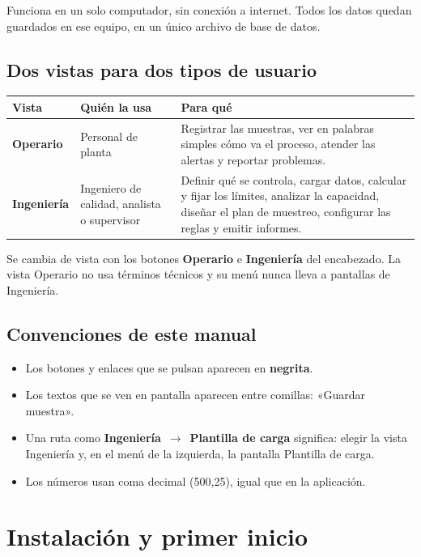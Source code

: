 \documentclass[11pt,a4paper]{article}
\newcommand{\boton}[1]{\textbf{#1}}                      %
\newcommand{\campo}[1]{«#1»}                             %
\newcommand{\ruta}[2]{\textbf{#1}~$\rightarrow$~\textbf{#2}} %
\begin{document}
Funciona en un solo computador, sin conexión a internet. Todos los datos quedan guardados en ese
equipo, en un único archivo de base de datos.

\subsection{Dos vistas para dos tipos de usuario}

\begin{tabularx}{\linewidth}{@{}P{2.6cm}P{4.2cm}L@{}}
\toprule
\textbf{Vista} & \textbf{Quién la usa} & \textbf{Para qué}\\
\midrule
\textbf{Operario} & Personal de planta & Registrar las muestras, ver en palabras simples cómo va el proceso, atender las alertas y reportar problemas.\\
\textbf{Ingeniería} & Ingeniero de calidad, analista o supervisor & Definir qué se controla, cargar datos, calcular y fijar los límites, analizar la capacidad, diseñar el plan de muestreo, configurar las reglas y emitir informes.\\
\bottomrule
\end{tabularx}

Se cambia de vista con los botones \boton{Operario} e \boton{Ingeniería} del encabezado. La vista
Operario no usa términos técnicos y su menú nunca lleva a pantallas de Ingeniería.

\subsection{Convenciones de este manual}
\begin{itemize}
\item Los botones y enlaces que se pulsan aparecen en \boton{negrita}.
\item Los textos que se ven en pantalla aparecen entre comillas: \campo{Guardar muestra}.
\item Una ruta como \ruta{Ingeniería}{Plantilla de carga} significa: elegir la vista Ingeniería y,
  en el menú de la izquierda, la pantalla Plantilla de carga.
\item Los números usan coma decimal (500,25), igual que en la aplicación.
\end{itemize}

\section{Instalación y primer inicio}
\end{document}
